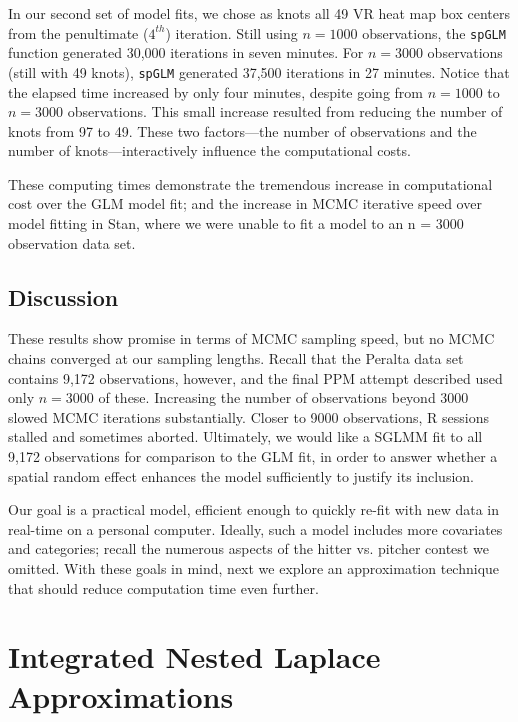 In our second set of model fits, we chose as knots all 49 VR heat map box centers from the penultimate ($4^{th}$) iteration. Still using $n = 1000$ observations, the \verb|spGLM| function generated 30,000 iterations in seven minutes. For $n = 3000$ observations (still with 49 knots), \verb|spGLM| generated 37,500 iterations in 27 minutes. Notice that the elapsed time increased by only four minutes, despite going from $n = 1000$ to $n = 3000$ observations. This small increase resulted from reducing the number of knots from 97 to 49. These two factors---the number of observations and the number of knots---interactively influence the computational costs. 

These computing times demonstrate the tremendous increase in computational cost over the GLM model fit; and the increase in MCMC iterative speed over model fitting in Stan, where we were unable to fit a model to an n = 3000 observation data set. 

\subsection{Discussion} %
These results show promise in terms of MCMC sampling speed, but no MCMC chains converged at our sampling lengths. Recall that the Peralta data set contains 9,172 observations, however, and the final PPM attempt described used only $n = 3000$ of these. Increasing the number of observations beyond 3000 slowed MCMC iterations substantially. Closer to 9000 observations, R sessions stalled and sometimes aborted. Ultimately, we would like a SGLMM fit to all 9,172 observations for comparison to the GLM fit, in order to answer whether a spatial random effect enhances the model sufficiently to justify its inclusion.  

Our goal is a practical model, efficient enough to quickly re-fit with new data in real-time on a personal computer. Ideally, such a model includes more covariates and categories; recall the numerous aspects of the hitter vs. pitcher contest we omitted. With these goals in mind, next we explore an approximation technique that should reduce computation time even further.

\section{Integrated Nested Laplace Approximations} \label{INLA} 

